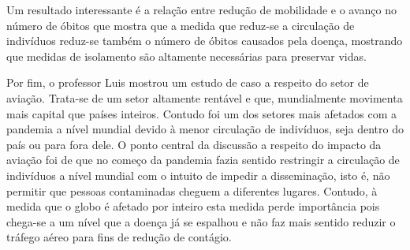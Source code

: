 Um resultado interessante é a relação entre redução de mobilidade e o avanço no número de óbitos que mostra que a medida que reduz-se a circulação de indivíduos reduz-se também o número de óbitos causados pela doença, mostrando que medidas de isolamento são altamente necessárias para preservar vidas.

Por fim, o professor Luis mostrou um estudo de caso a respeito do setor de aviação. Trata-se de um setor altamente rentável e que, mundialmente movimenta mais capital que países inteiros. Contudo foi um dos setores mais afetados com a pandemia a nível mundial devido à menor circulação de indivíduos, seja dentro do país ou para fora dele. O ponto central da discussão a respeito do impacto da aviação foi de que no começo da pandemia fazia sentido restringir a circulação de indivíduos a nível mundial com o intuito de impedir a disseminação, isto é, não permitir que pessoas contaminadas cheguem a diferentes lugares. Contudo, à medida que o globo é afetado por inteiro esta medida perde importância pois chega-se a um nível que a doença já se espalhou e não faz mais sentido reduzir o tráfego aéreo para fins de redução de contágio.


